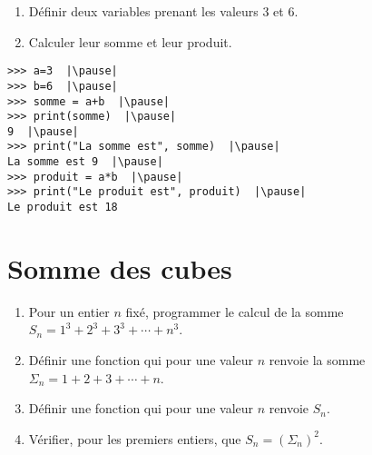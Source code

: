 \begin{frame}[fragile]


\begin{tp}
\begin{enumerate}
  \item Définir deux variables prenant les valeurs $3$ et $6$.
  \item Calculer leur somme et leur produit.
\end{enumerate}  
\end{tp}

\pause

\begin{algo}
\begin{lstlisting}
>>> a=3  |\pause|
>>> b=6  |\pause|
>>> somme = a+b  |\pause|
>>> print(somme)  |\pause|
9  |\pause|
>>> print("La somme est", somme)  |\pause|
La somme est 9  |\pause|
>>> produit = a*b  |\pause|
>>> print("Le produit est", produit)  |\pause|
Le produit est 18
\end{lstlisting}  
\end{algo}

\end{frame}


\section{Somme des cubes}

\begin{frame}

\begin{tp}
\begin{enumerate}
  \item Pour un entier $n$ fixé, programmer le calcul de la somme $S_n = 1^3+2^3+3^3+ \cdots + n^3$. 
  \item Définir une fonction qui pour une valeur $n$ renvoie la somme $\Sigma_n = 1+2+3+\cdots+n$.  
  \item Définir une fonction qui pour une valeur $n$ renvoie $S_n$.
  \item Vérifier, pour les premiers entiers, que $S_n = (\Sigma_n)^2$.
\end{enumerate}  
\end{tp}

\end{frame}


